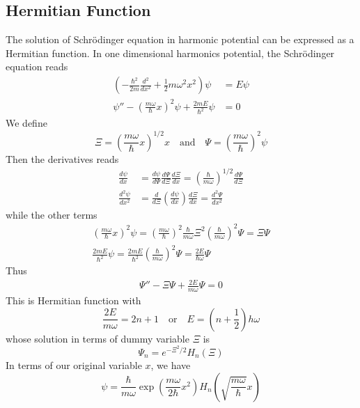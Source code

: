 \documentclass[../../main.tex]{subfiles}
\begin{document}
\subsection*{Hermitian Function}
The solution of Schrödinger equation in harmonic potential can be expressed as a Hermitian function. In one dimensional harmonics potential, the Schrödinger equation reads
\begin{align*}
  \left(-\frac{\hbar^2}{2m}\frac{d^2}{dx^2}+\frac{1}{2}m\omega^2x^2\right)\psi&= E\psi\\
  \psi''-\left(\frac{m\omega}{\hbar}x\right)^2\psi+\frac{2mE}{\hbar^2}\psi&=0
\end{align*}
We define 
\begin{equation*}
  \Xi=\left(\frac{m\omega}{\hbar}x\right)^{1/2}x\quad\text{and}\quad\Psi=\left(\frac{m\omega}{\hbar}\right)^2\psi
\end{equation*}
Then the derivatives reads
\begin{align*}
  \frac{d\psi}{dx}&=\frac{d\psi}{d\Psi}\frac{d\Psi}{d\Xi}\frac{d\Xi}{dx}=\left(\frac{\hbar}{m\omega}\right)^{1/2}\frac{d\Psi}{d\Xi}\\
  \frac{d^2\psi}{dx^2}&=\frac{d}{d\Xi}\left(\frac{d\psi}{dx}\right)\frac{d\Xi}{dx}=\frac{d^2\Psi}{dx^2}
\end{align*}
while the other terms 
\begin{gather*}
  \left(\frac{m\omega}{\hbar}x\right)^2\psi=\left(\frac{m\omega}{\hbar}\right)^2\frac{\hbar}{m\omega}\Xi^2\left(\frac{\hbar}{m\omega}\right)^2\Psi=\Xi\Psi\\
  \frac{2mE}{\hbar^2}\psi=\frac{2mE}{\hbar^2}\left(\frac{\hbar}{m\omega}\right)^2\Psi=\frac{2E}{\hbar\omega}\Psi
\end{gather*}
Thus 
\begin{align*}
  \Psi''-\Xi\Psi+\frac{2E}{m\omega}\Psi=0
\end{align*}
This is Hermitian function with 
\begin{equation*}
  \frac{2E}{m\omega}=2n+1\quad\text{or}\quad E=\left(n+\frac{1}{2}\right)h\omega
\end{equation*}
whose solution in terms of dummy variable $\Xi$ is 
\begin{equation*}
  \Psi_n=e^{-\Xi^2/2}H_n(\Xi)
\end{equation*}
In terms of our original variable $x$, we have 
\begin{equation*}
  \psi=\frac{\hbar}{m\omega}\exp\left(\frac{m\omega}{2\hbar}x^2\right)H_n\left(\sqrt{\frac{m\omega}{\hbar}}x\right)
\end{equation*}
\end{document}
